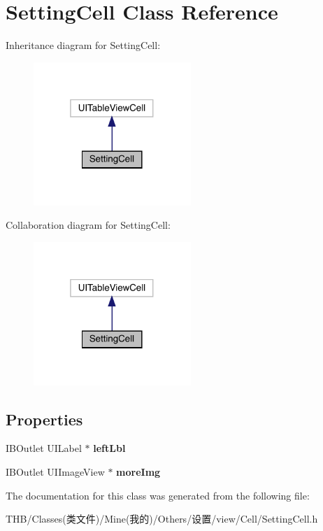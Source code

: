 \hypertarget{interface_setting_cell}{}\section{Setting\+Cell Class Reference}
\label{interface_setting_cell}


Inheritance diagram for Setting\+Cell\+:\nopagebreak
\begin{figure}[H]
\begin{center}
\leavevmode
\includegraphics[width=169pt]{interface_setting_cell__inherit__graph}
\end{center}
\end{figure}


Collaboration diagram for Setting\+Cell\+:\nopagebreak
\begin{figure}[H]
\begin{center}
\leavevmode
\includegraphics[width=169pt]{interface_setting_cell__coll__graph}
\end{center}
\end{figure}
\subsection*{Properties}
\begin{DoxyCompactItemize}
\item 
\mbox{\label{interface_setting_cell_ad696aba40c717782c4773946138e19ee}} 
I\+B\+Outlet U\+I\+Label $\ast$ {\bfseries left\+Lbl}
\item 
\mbox{\label{interface_setting_cell_ad3bbfc253ac13fe2eb80cf7e90760249}} 
I\+B\+Outlet U\+I\+Image\+View $\ast$ {\bfseries more\+Img}
\end{DoxyCompactItemize}


The documentation for this class was generated from the following file\+:\begin{DoxyCompactItemize}
\item 
T\+H\+B/\+Classes(类文件)/\+Mine(我的)/\+Others/设置/view/\+Cell/Setting\+Cell.\+h\end{DoxyCompactItemize}

